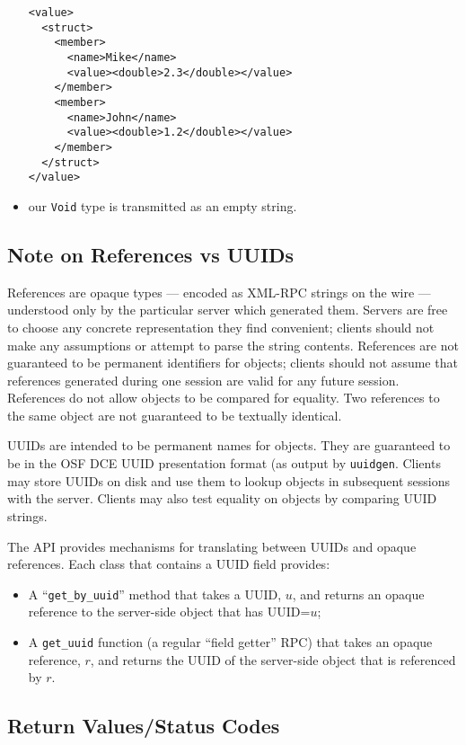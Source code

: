 \begin{itemize}
  \begin{verbatim}
<value>
  <struct>
    <member>
      <name>Mike</name>
      <value><double>2.3</double></value>
    </member>
    <member>
      <name>John</name>
      <value><double>1.2</double></value>
    </member>
  </struct>
</value>
  \end{verbatim}

  \item our {\tt Void} type is transmitted as an empty string.

\end{itemize}

\subsection{Note on References vs UUIDs}

References are opaque types --- encoded as XML-RPC strings on the wire --- understood
only by the particular server which generated them. Servers are free to choose
any concrete representation they find convenient; clients should not make any 
assumptions or attempt to parse the string contents. References are not guaranteed
to be permanent identifiers for objects; clients should not assume that references 
generated during one session are valid for any future session. References do not
allow objects to be compared for equality. Two references to the same object are
not guaranteed to be textually identical.

UUIDs are intended to be permanent names for objects. They are
guaranteed to be in the OSF DCE UUID presentation format (as output by {\tt uuidgen}.
Clients may store UUIDs on disk and use them to lookup objects in subsequent sessions
with the server. Clients may also test equality on objects by comparing UUID strings.

The API provides mechanisms
for translating between UUIDs and opaque references. Each class that contains a UUID
field provides:
\begin{itemize}
\item  A ``{\tt get\_by\_uuid}'' method that takes a UUID, $u$, and returns an opaque reference
to the server-side object that has UUID=$u$; 
\item A {\tt get\_uuid} function (a regular ``field getter'' RPC) that takes an opaque reference,
$r$, and returns the UUID of the server-side object that is referenced by $r$.
\end{itemize}

\subsection{Return Values/Status Codes}
\label{synchronous-result}

